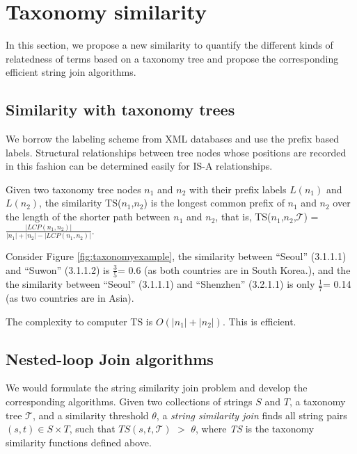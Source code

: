 \section{Taxonomy similarity}

In this section, we propose a new similarity to quantify the different kinds of relatedness of terms based on a taxonomy tree and propose the corresponding efficient string join algorithms.


\subsection{Similarity with taxonomy trees}


 We borrow the labeling scheme from XML databases and use the prefix based labels. Structural relationships between tree nodes whose positions
are recorded in this fashion can be determined easily for IS-A relationships.

\smallskip
\smallskip

\begin{definition}
Given two taxonomy tree nodes $n_1$ and $n_2$ with their prefix labels $L(n_1)$ and $L(n_2)$,  the similarity TS($n_1$,$n_2$) is the longest common prefix of  $n_1$ and $n_2$ over the length of the shorter path between $n_1$ and $n_2$, that is,  TS($n_1$,$n_2$,$\mathcal{T}$) = $\frac{|LCP(n_1,n_2)|}{|n_1|+|n_2|- |LCP(n_1,n_2)|}$. \end{definition}

\smallskip
\smallskip


\begin{example}
Consider Figure \ref{fig:taxonomyexample}, the similarity between ``\textsf{Seoul}'' (3.1.1.1) and ``\textsf{Suwon}'' (3.1.1.2) is $\frac{3}{5}$= 0.6 (as both countries are in South Korea.), and the the similarity between ``\textsf{Seoul}''  (3.1.1.1) and ``\textsf{Shenzhen}'' (3.2.1.1) is only $\frac{1}{7}$= 0.14 (as two countries are in Asia).
\end{example}

The complexity to computer TS is $O(|n_1|+|n_2|)$. This is efficient.


\subsection{ Nested-loop Join algorithms}


We would formulate the string similarity join problem and develop the corresponding algorithms. Given two collections of strings $S$ and $T$, a taxonomy tree
$\mathcal{T}$, and a similarity threshold $\theta$, a \textit{string
  similarity join} finds all string pairs $(s, t) \in S \times T$,
such that $TS(s,t,\mathcal{T})$ $>$ $\theta$, where \textit{TS} is
 the taxonomy similarity functions defined above.



